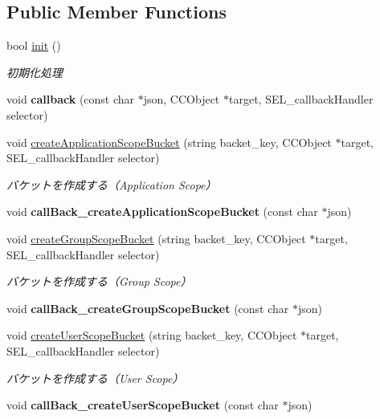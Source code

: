 \subsection*{Public Member Functions}
\begin{DoxyCompactItemize}
\item 
bool \hyperlink{class_c_kii_bucket_ae687c3b2a7e95b6e425303c9d944d35b}{init} ()
\begin{DoxyCompactList}\small\item\em 初期化処理 \end{DoxyCompactList}\item 
\hypertarget{class_c_kii_bucket_a1f4fd49239cd277c1861c83fcb5e098b}{void {\bfseries callback} (const char $\ast$json, C\-C\-Object $\ast$target, S\-E\-L\-\_\-callback\-Handler selector)}\label{class_c_kii_bucket_a1f4fd49239cd277c1861c83fcb5e098b}

\item 
void \hyperlink{class_c_kii_bucket_a66ba352bd451a254a871903e4f28502c}{create\-Application\-Scope\-Bucket} (string backet\-\_\-key, C\-C\-Object $\ast$target, S\-E\-L\-\_\-callback\-Handler selector)
\begin{DoxyCompactList}\small\item\em バケットを作成する（\-Application Scope） \end{DoxyCompactList}\item 
\hypertarget{class_c_kii_bucket_a260a88c89b192ba5cf2c64b5a99d7dac}{void {\bfseries call\-Back\-\_\-create\-Application\-Scope\-Bucket} (const char $\ast$json)}\label{class_c_kii_bucket_a260a88c89b192ba5cf2c64b5a99d7dac}

\item 
void \hyperlink{class_c_kii_bucket_ae5bcfa361cef3e6d688335bf2497de13}{create\-Group\-Scope\-Bucket} (string backet\-\_\-key, C\-C\-Object $\ast$target, S\-E\-L\-\_\-callback\-Handler selector)
\begin{DoxyCompactList}\small\item\em バケットを作成する（\-Group Scope） \end{DoxyCompactList}\item 
\hypertarget{class_c_kii_bucket_a7838074f46d59130d0950df5a3ff4753}{void {\bfseries call\-Back\-\_\-create\-Group\-Scope\-Bucket} (const char $\ast$json)}\label{class_c_kii_bucket_a7838074f46d59130d0950df5a3ff4753}

\item 
void \hyperlink{class_c_kii_bucket_a3b9f2e2cc08c74d99fcda0d4f461befd}{create\-User\-Scope\-Bucket} (string backet\-\_\-key, C\-C\-Object $\ast$target, S\-E\-L\-\_\-callback\-Handler selector)
\begin{DoxyCompactList}\small\item\em バケットを作成する（\-User Scope） \end{DoxyCompactList}\item 
\hypertarget{class_c_kii_bucket_a7b2b01aac65959c483b6eefd628b9ae8}{void {\bfseries call\-Back\-\_\-create\-User\-Scope\-Bucket} (const char $\ast$json)}\label{class_c_kii_bucket_a7b2b01aac65959c483b6eefd628b9ae8}


\end{DoxyCompactItemize}
